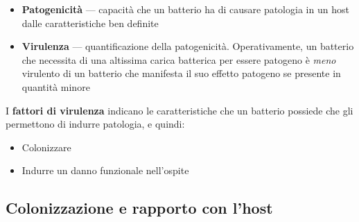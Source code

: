 \documentclass[italian,]{article}
\providecommand{\tightlist}{%
  \setlength{\itemsep}{0pt}\setlength{\parskip}{0pt}}
\newcommand{\normalbox}[2]{\begin{tcolorbox}[title=#1]#2\end{tcolorbox}} %
\begin{document}
\normalbox{Patogenicità vs virulenza}{
\begin{itemize} \tightlist
\item \textbf{Patogenicità} --- capacità che un batterio ha di causare patologia in un host dalle caratteristiche ben definite
\item \textbf{Virulenza} --- quantificazione della patogenicità. Operativamente, un batterio che necessita di una altissima carica batterica per essere patogeno è \emph{meno} virulento di un batterio che manifesta il suo effetto patogeno se presente in quantità minore
\end{itemize}
\tcblower
I \textbf{fattori di virulenza} indicano le caratteristiche che un batterio possiede che gli permettono di indurre patologia, e quindi:
\begin{itemize} \tightlist
\item Colonizzare
\item Indurre un danno funzionale nell'ospite
\end{itemize}
}

\hypertarget{colonizzazione-e-rapporto-con-lhost}{%
\subsection{Colonizzazione e rapporto con
l'host}\label{colonizzazione-e-rapporto-con-lhost}}
\end{document}
